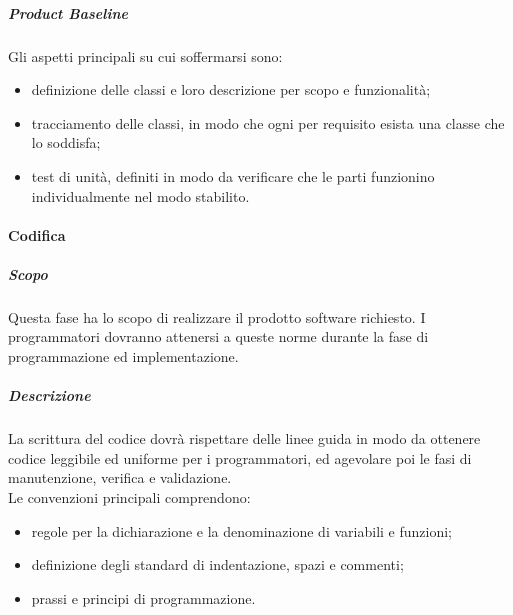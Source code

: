 \documentclass[]{article}
\begin{document}
						\subparagraph{Product Baseline}
						Gli aspetti principali su cui soffermarsi sono:
						\begin{itemize}
							\item definizione delle classi e loro descrizione per scopo e funzionalità;
							\item tracciamento delle classi, in modo che ogni per requisito esista una classe che lo soddisfa;
							\item test di unità, definiti in modo da verificare che le parti funzionino individualmente nel modo stabilito.
						\end{itemize} 
					
					\paragraph{Codifica}
						\subparagraph{Scopo}
						Questa fase ha lo scopo di realizzare il prodotto software richiesto. I programmatori dovranno attenersi a queste norme durante la fase di programmazione ed implementazione.
						\subparagraph{Descrizione}
						La scrittura del codice dovrà rispettare delle linee guida in modo da ottenere codice leggibile ed uniforme per i programmatori, ed agevolare poi le fasi di manutenzione, verifica e validazione. \\
						Le convenzioni principali comprendono:
						\begin{itemize}
							\item regole per la dichiarazione e la denominazione di variabili e funzioni;
							\item definizione degli standard di indentazione, spazi e commenti;
							\item prassi e principi di programmazione.
						\end{itemize}
						
\end{document}
